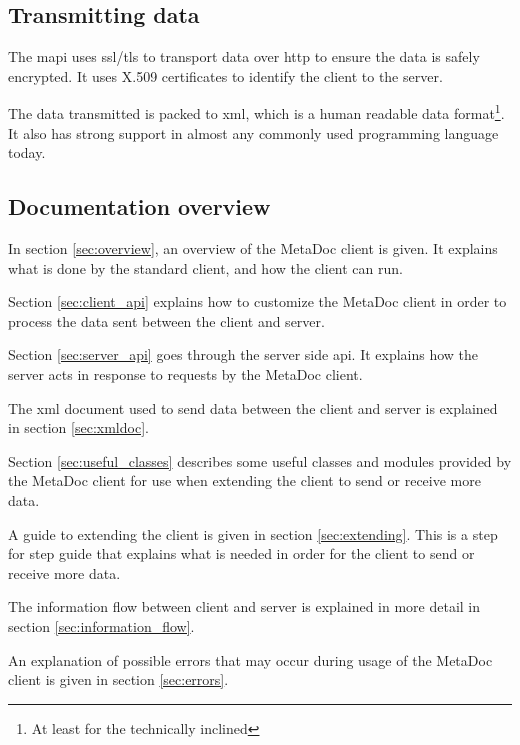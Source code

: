 \subsection{Transmitting data}
The \gls{mapi} uses \gls{ssl}/\gls{tls} to transport data over \gls{http} to
ensure the data is safely encrypted. It uses X.509 certificates to identify the
client to the server. 

The data transmitted is packed to \gls{xml}, which is a human readable data
format\footnote{At least for the technically inclined}. It also has strong
support in almost any commonly used programming language today.  

\subsection{Documentation overview}
In section \ref{sec:overview}, an overview of the MetaDoc client is given. It
explains what is done by the standard client, and how the client can run. 

Section \ref{sec:client_api} explains how to customize the MetaDoc client in
order to process the data sent between the client and server. 

Section \ref{sec:server_api} goes through the server side \gls{api}. It
explains how the server acts in response to requests by the MetaDoc client. 

The \gls{xml} document used to send data between the client and server is
explained in section \ref{sec:xmldoc}. 

Section \ref{sec:useful_classes} describes some useful classes and modules
provided by the MetaDoc client for use when extending the client to send or
receive more data. 

A guide to extending the client is given in section \ref{sec:extending}. This
is a step for step guide that explains what is needed in order for the client
to send or receive more data. 

The information flow between client and server is explained in more detail in
section \ref{sec:information_flow}.

An explanation of possible errors that may occur during usage of the MetaDoc
client is given in section \ref{sec:errors}. 
